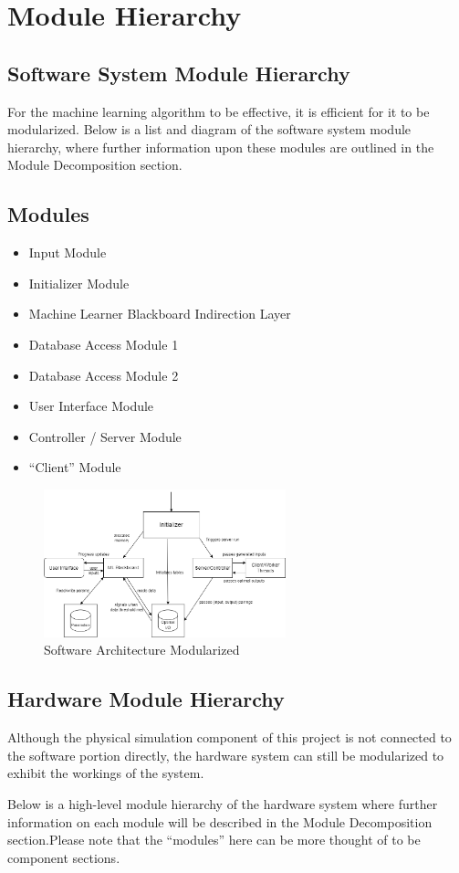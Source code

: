 \documentclass[12pt, titlepage]{article}
\begin{document}
\section{Module Hierarchy}
\subsection{Software System Module Hierarchy}
For the machine learning algorithm to be effective, it is efficient for it to be modularized. Below is a list and diagram of the software system module hierarchy, where further information upon these modules are outlined in the Module Decomposition section.

\subsection{Modules}
\begin{itemize}
  \item Input Module
  \item Initializer Module
  \item Machine Learner Blackboard Indirection Layer
  \item Database Access Module 1
  \item Database Access Module 2
  \item User Interface Module
  \item Controller / Server Module
  \item “Client” Module
\end{itemize}

\begin{figure}[htp]
  \centering
  \includegraphics[width=7cm]{images/Figure7.png}
  \caption[Software Architecture Modules]{Software Architecture Modularized }
  \label{fig:figure7}
\end{figure}

\subsection{Hardware Module Hierarchy}
Although the physical simulation component of this project is not connected to the software portion directly, the hardware system can still be modularized to exhibit the workings of the system.
\par 
Below is a high-level module hierarchy of the hardware system where further information on each module will be described in the Module Decomposition section.Please note that the “modules” here can be more thought of to be component sections.
\par
\end{document}
